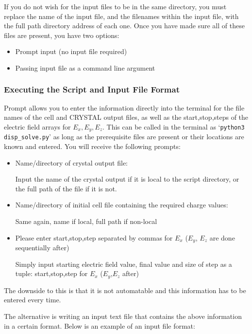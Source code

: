 \documentclass[10pt]{article}
\begin{document}
If you do not wish for the input files to be in the same directory, you must replace the name of the input file, and the filenames within the input file, with the full path directory address of each one. Once you have made sure all of these files are present, you have two options: 
\begin{itemize}
	\item Prompt input (no input file required)
	\item Passing input file as a command line argument
\end{itemize}

\subsubsection{Executing the Script and Input File Format}
Prompt allows you to enter the information directly into the terminal for the file names of the cell and CRYSTAL output files, as well as the start,stop,steps of the electric field arrays for $E_x,E_y,E_z$. This can be called in the terminal as `\texttt{python3 disp\_solve.py}' as long as the prerequisite files are present or their locations are known and entered. You will receive the following prompts:

\begin{itemize}
	\item Name/directory of crystal output file:
	
	Input the name of the crystal output if it is local to the script directory, or the full path of the file if it is not.
	
	\item Name/directory of initial cell file containing the required charge values:
	
	Same again, name if local, full path if non-local
	
	\item Please enter start,stop,step separated by commas for $E_x$ ($E_y$, $E_z$ are done sequentially after)
	
	Simply input starting electric field value, final value and size of step as a tuple: start,stop,step for $E_x$ ($E_y$,$E_z$ after)
\end{itemize}

The downside to this is that it is not automatable and this information has to be entered every time.

The alternative is writing an input text file that contains the above information in a certain format. Below is an example of an input file format:
\end{document}
